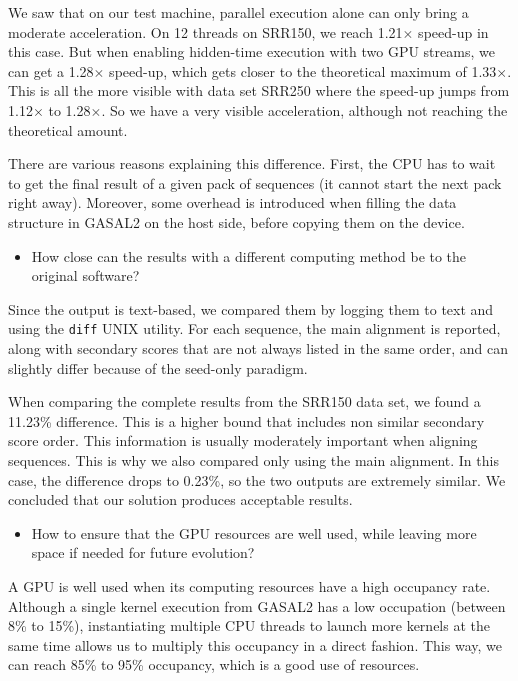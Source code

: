We saw that on our test machine, parallel execution alone can only bring a moderate acceleration. On 12 threads on SRR150, we reach 1.21$\times$ speed-up in this case. But when enabling hidden-time execution with two GPU streams, we can get a 1.28$\times$ speed-up, which gets closer to the theoretical maximum of 1.33$\times$. This is all the more visible with data set SRR250 where the speed-up jumps from 1.12$\times$ to 1.28$\times$. So we have a very visible acceleration, although not reaching the theoretical amount. 

There are various reasons explaining this difference. First, the CPU has to wait to get the final result of a given pack of sequences (it cannot start the next pack right away). Moreover, some overhead is introduced when filling the data structure in GASAL2 on the host side, before copying them on the device.

\begin{itemize}
	\item How close can the results with a different computing method be to the original software?
\end{itemize}

Since the output is text-based, we compared them by logging them to text and using the \verb|diff| UNIX utility. For each sequence, the main alignment is reported, along with secondary scores that are not always listed in the same order, and can slightly differ because of the seed-only paradigm.

When comparing the complete results from the SRR150 data set, we found a 11.23\% difference. This is a higher bound that includes non similar secondary score order. This information is usually moderately important when aligning sequences. This is why we also compared only using the main alignment. In this case, the difference drops to 0.23\%, so the two outputs are extremely similar. We concluded that our solution produces acceptable results.

\begin{itemize}
	\item How to ensure that the GPU resources are well used, while leaving more space if needed for future evolution?
\end{itemize}

A GPU is well used when its computing resources have a high occupancy rate. Although a single kernel execution from GASAL2 has a low occupation (between 8\% to 15\%), instantiating multiple CPU threads to launch more kernels at the same time allows us to multiply this occupancy in a direct fashion. This way, we can reach 85\% to 95\% occupancy, which is a good use of resources.

